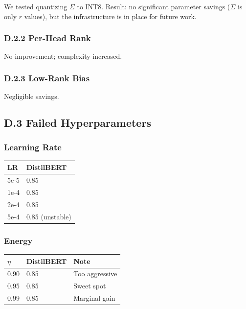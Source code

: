 We tested quantizing $\Sigma$ to INT8. Result: no significant parameter 
savings ($\Sigma$ is only $r$ values), but the infrastructure is in place for 
future work.

\subsubsection{D.2.2 Per-Head Rank}

No improvement; complexity increased.

\subsubsection{D.2.3 Low-Rank Bias}

Negligible savings.

\subsection{D.3 Failed Hyperparameters}

\subsubsection{Learning Rate}

\begin{table}[H]
\centering
\small
\begin{tabular}{ll}
\toprule
\textbf{LR} & \textbf{DistilBERT} \\
\midrule
5e-5 & 0.85 \\
1e-4 & 0.85 \\
2e-4 & 0.85 \\
5e-4 & 0.85 (unstable) \\
\bottomrule
\end{tabular}
\end{table}

\subsubsection{Energy}

\begin{table}[H]
\centering
\small
\begin{tabular}{lll}
\toprule
\textbf{$\eta$} & \textbf{DistilBERT} & \textbf{Note} \\
\midrule
0.90 & 0.85 & Too aggressive \\
0.95 & 0.85 & Sweet spot \\
0.99 & 0.85 & Marginal gain \\
\bottomrule
\end{tabular}
\end{table}

